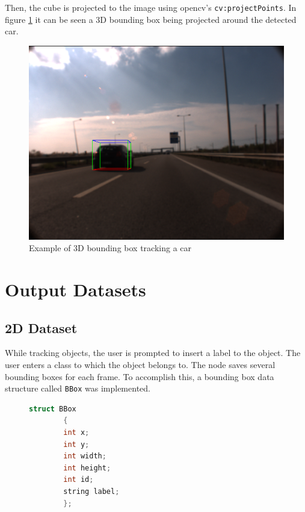 Then, the cube is projected to the image using \gls{opencv}'s \texttt{cv:projectPoints}. In figure \ref{fig:cube} it can be seen a 3D bounding box being projected around the detected car.

\begin{figure}[htp]
	
	\centering
	\includegraphics[width=.7\textwidth]{caplabel/imgs/3dcube.png}
	
	\caption{Example of 3D bounding box tracking a car}
	\label{fig:cube}
	
\end{figure}

\section{Output Datasets}

\subsection{2D Dataset}

While tracking objects, the user is prompted to insert a label to the object. The user enters a class to which the object belongs to. The node saves several bounding boxes for each frame. To accomplish this, a bounding box data structure called \texttt{BBox} was implemented.

\begin{figure}
	\begin{center}
		\begin{lstlisting}[label={lst:BBox2d}, caption={BBox struct definition used for 2D datasets.},language=c++]
		struct BBox
		{
		int x;
		int y;
		int width;
		int height;
		int id;
		string label;
		};\end{lstlisting}
	\end{center}
\end{figure}


